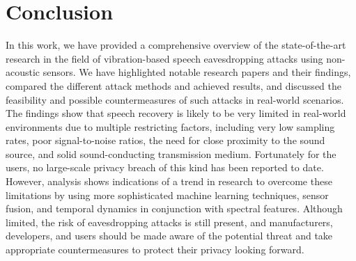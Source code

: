 \documentclass[sigconf, nonacm]{acmart}
\begin{document}
\section{Conclusion}
In this work, we have provided a comprehensive overview of the state-of-the-art research in the field of vibration-based speech eavesdropping attacks using non-acoustic sensors.
We have highlighted notable research papers and their findings, compared the different attack methods and achieved results, and discussed the feasibility and possible countermeasures of such attacks in real-world scenarios.
The findings show that speech recovery is likely to be very limited in real-world environments due to multiple restricting factors, including very low sampling rates, poor signal-to-noise ratios, the need for close proximity to the sound source, and solid sound-conducting transmission medium.
Fortunately for the users, no large-scale privacy breach of this kind has been reported to date.
However, analysis shows indications of a trend in research to overcome these limitations by using more sophisticated machine learning techniques, sensor fusion, and temporal dynamics in conjunction with spectral features.
Although limited, the risk of eavesdropping attacks is still present, and manufacturers, developers, and users should be made aware of the potential threat and take appropriate countermeasures to protect their privacy looking forward.






\end{document}

